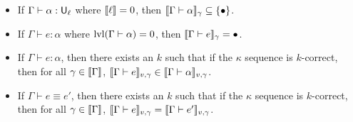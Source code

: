 \begin{theorem}[Soundness]\label{thm:sound}
\begin{itemize}
\item If $\Gamma\vdash \alpha:\U_\ell$ where $\llbracket \ell\rrbracket=0$, then $\scott{\Gamma\vdash\alpha}_\gamma\subseteq\{\bullet\}$.
\item If $\Gamma\vdash e:\alpha$ where $\lvl(\Gamma\vdash\alpha)=0$, then $\scott{\Gamma\vdash e}_\gamma=\bullet$.
\item If $\Gamma\vdash e:\alpha$, then there exists an $k$ such that if the $\kappa$ sequence is $k$-correct, then for all $\gamma\in\scott{\Gamma}$, $\scott{\Gamma\vdash e}_{v,\gamma}\in \scott{\Gamma\vdash \alpha}_{v,\gamma}$.
\item If $\Gamma\vdash e\equiv e'$, then there exists an $k$ such that if the $\kappa$ sequence is $k$-correct, then for all $\gamma\in\scott{\Gamma}$, $\scott{\Gamma\vdash e}_{v,\gamma}=\scott{\Gamma\vdash e'}_{v,\gamma}$.
\end{itemize}
\end{theorem}
